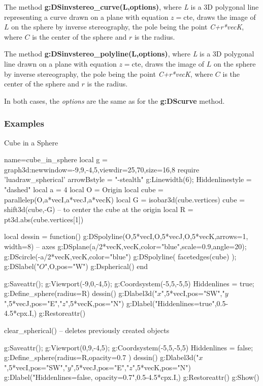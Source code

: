 The method \textbf{g:DSinvstereo\_curve(L,options)}, where \emph{L} is a 3D polygonal line representing a curve drawn on a plane with equation $z =$cte, draws the image of $L$ on the sphere by inverse stereography, the pole being the point \emph{C+r*vecK}, where $C$ is the center of the sphere and $r$ is the radius.

The method \textbf{g:DSinvstereo\_polyline(L,options)}, where \emph{L} is a 3D polygonal line drawn on a plane with equation $z =$cte, draws the image of $L$ on the sphere by inverse stereography, the pole being the point \emph{C+r*vecK}, where $C$ is the center of the sphere and $r$ is the radius.

In both cases, the \emph{options} are the same as for the \textbf{g:DScurve} method.

\subsubsection{Examples}

\begin{demo}{Cube in a Sphere}
\begin{luadraw}{name=cube_in_sphere}
local g = graph3d:new{window={-9,9,-4,5},viewdir={25,70},size={16,8}}
require 'luadraw_spherical'
arrowBstyle = "-stealth"
g:Linewidth(6); Hiddenlinestyle = "dashed"
local a = 4
local O = Origin
local cube = parallelep(O,a*vecI,a*vecJ,a*vecK)
local G = isobar3d(cube.vertices)
cube = shift3d(cube,-G) -- to center the cube at the origin
local R = pt3d.abs(cube.vertices[1])

local dessin = function()
    g:DSpolyline({{O,5*vecI},{O,5*vecJ},{O,5*vecK}},{arrows=1, width=8}) -- axes
    g:DSplane({a/2*vecK,vecK},{color="blue",scale=0.9,angle=20}); 
    g:DScircle({-a/2*vecK,vecK},{color="blue"})
    g:DSpolyline( facetedges(cube) ); g:DSlabel("$O$",O,{pos="W"})
    g:Dspherical()
end

g:Saveattr(); g:Viewport(-9,0,-4,5); g:Coordsystem(-5,5,-5,5)
Hiddenlines = true; g:Define_sphere({radius=R})
dessin()
g:Dlabel3d("$x$",5*vecI,{pos="SW"},"$y$",5*vecJ,{pos="E"},"$z$",5*vecK,{pos="N"})
g:Dlabel("Hiddenlines=true",0.5-4.5*cpx.I,{})
g:Restoreattr()

clear_spherical() -- deletes previously created objects

g:Saveattr(); g:Viewport(0,9,-4,5); g:Coordsystem(-5,5,-5,5)
Hiddenlines = false; g:Define_sphere({radius=R,opacity=0.7} )
dessin()
g:Dlabel3d("$x$",5*vecI,{pos="SW"},"$y$",5*vecJ,{pos="E"},"$z$",5*vecK,{pos="N"})
g:Dlabel("Hiddenlines=false, opacity=0.7",0.5-4.5*cpx.I,{})
g:Restoreattr()
g:Show()
\end{luadraw}
\end{demo}

